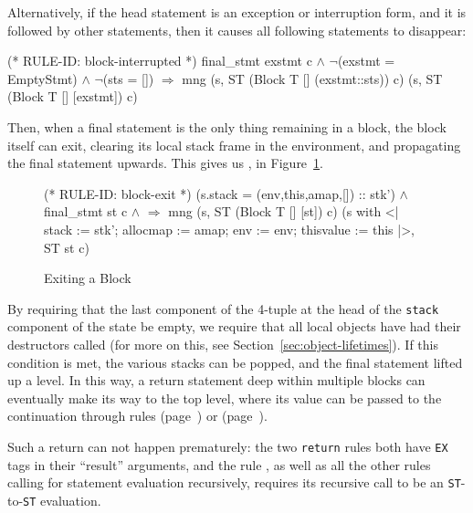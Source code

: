 \documentclass[11pt]{article}
\begin{document}
Alternatively, if the head statement is an exception or interruption
form, and it is followed by other statements, then it causes all
following statements to disappear:%
%
\begin{stdrule}
(* RULE-ID: block-interrupted *)
     final_stmt exstmt c \(\land\)
     \(\neg\)(exstmt = EmptyStmt) \(\land\)
     \(\neg\)(sts = [])
   \(\Rightarrow\)
     mng (s, ST (Block T [] (exstmt::sts)) c)
         (s, ST (Block T [] [exstmt]) c)
\end{stdrule}

Then, when a final statement is the only thing remaining in a block,
the block itself can exit, clearing its local stack frame in the
environment, and propagating the final statement upwards.  This gives
us , in Figure~\ref{fig:block-exit}.
\begin{figure}
\begin{stdrule}
(* RULE-ID: block-exit *)
     (s.stack = (env,this,amap,[]) :: stk') \(\land\)
     final_stmt st c \(\land\)
   \(\Rightarrow\)
     mng (s, ST (Block T [] [st]) c)
         (s with <| stack := stk';
                    allocmap := amap;
                    env := env;
                    thisvalue := this |>,
          ST st c)
\end{stdrule}
\caption{Exiting a Block}
\label{fig:block-exit}
\end{figure}
By requiring that the last component of the 4-tuple at the head of the
\texttt{stack} component of the state be empty, we require that all
local objects have had their destructors called (for more on this, see
Section~\ref{sec:object-lifetimes}).  If this condition is met, the
various stacks can be popped, and the final statement lifted up a
level.  In this way, a return statement deep within multiple blocks
can eventually make its way to the top level, where its value can be
passed to the continuation through rules 
(page~\pageref{rule:return-rvalue}) or 
(page~\pageref{rule:return-lvalue}).

  Such a return can not
happen prematurely: the two \texttt{return} rules both have
\texttt{EX} tags in their ``result'' arguments, and the rule
, as well as all the other rules calling
for statement evaluation recursively, requires its recursive call to
be an \texttt{ST}-to-\texttt{ST} evaluation.
\end{document}
